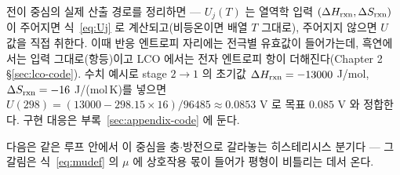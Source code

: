 전이 중심의 실제 산출 경로를 정리하면 --- $U_j(T)$ 는 열역학 입력 $(\Delta H_{\mathrm{rxn}},\Delta S_{\mathrm{rxn}})$ 이 주어지면
식~\eqref{eq:Uj} 로 계산되고(비등온이면 배열 $T$ 그대로), 주어지지 않으면 $U$ 값을 직접 취한다. 이때
반응 엔트로피 자리에는 전극별 유효값이 들어가는데, 흑연에서는 입력 그대로(항등)이고 LCO 에서는 전자
엔트로피 항이 더해진다(Chapter 2 \S\ref{sec:lco-code}). 수치 예시로 stage $2\to1$ 의 초기값
$\Delta H_{\mathrm{rxn}}=-13000$ J/mol, $\Delta S_{\mathrm{rxn}}=-16$ J/(mol\,K)를 넣으면
$U(298)=(13000-298.15\times16)/96485\approx0.0853$ V 로 목표 $0.085$ V 와 정합한다. 구현 대응은
부록~\ref{sec:appendix-code} 에 둔다.

다음은 같은 루프 안에서 이 중심을 충$\cdot$방전으로 갈라놓는 히스테리시스 분기다 --- 그 갈림은 식~\eqref{eq:mudef} 의
$\mu$ 에 상호작용 몫이 들어가 평형이 비틀리는 데서 온다.

